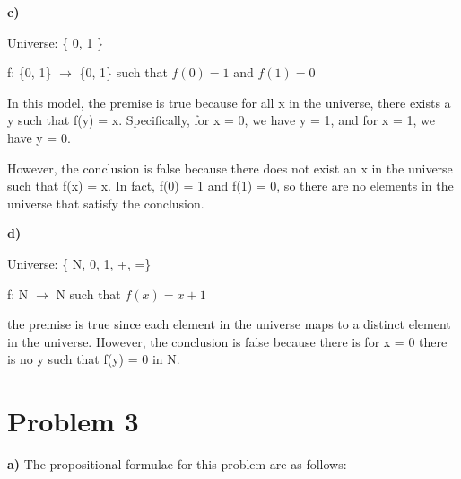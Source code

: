 \documentclass{article}
\begin{document}
\noindent \textbf{c)} \newline

Universe: \{ 0, 1 \}

f: \{0, 1\} $\rightarrow$ \{0, 1\} such that $f(0) = 1$ and $f(1) = 0$

In this model, the premise is true because for all x in the universe, there exists a y such that f(y) = x. Specifically, for x = 0, we have y = 1, and for x = 1, we have y = 0.

However, the conclusion is false because there does not exist an x in the universe such that f(x) = x. In fact, f(0) = 1 and f(1) = 0, so there are no elements in the universe that satisfy the conclusion.

\noindent \textbf{d)} \newline

Universe: \{ N, 0, 1, +, =\}

f: N $\rightarrow$ N such that $f(x) = x + 1$

the premise is true since each element in the universe maps to a distinct element in the universe. However, the conclusion is false because there is for x = 0 there is no y such that f(y) = 0 in N.

\section{Problem 3}

\noindent \textbf{a)} The propositional formulae for this problem are as follows:
\end{document}

